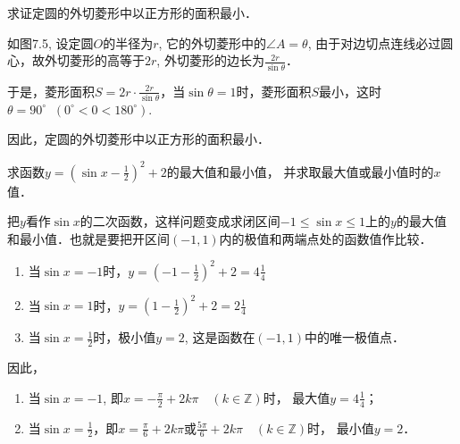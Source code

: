 \begin{example}
    求证定圆的外切菱形中以正方形的面积最小．
\end{example}

\begin{solution}
如图7.5, 设定圆$O$的半径为$r$, 它的外切菱形中的$\angle A=\theta$, 由于对边切点连线必过圆心，故外切菱形的高等于$2r$, 外切菱形的边长为$\frac{2r}{\sin\theta}$．

\begin{figure}[htp]
    \centering
    \caption{}
\end{figure}

    于是，菱形面积$S=2r\cdot \frac{2r}{\sin\theta}$，当$\sin\theta=1$时，菱形面积$S$最小，这时$\theta=90^{\circ}\;\;(0^{\circ}<0<180^{\circ})$.
    
因此，定圆的外切菱形中以正方形的面积最小．
\end{solution}

\begin{example}
求函数$y=\left(\sin x-\frac{1}{2}\right)^2+2$的最大值和最小值，
并求取最大值或最小值时的$x$值．
\end{example}

\begin{solution}
    把$y$看作$\sin x$的二次函数，这样问题变成求闭区间$-1\le \sin x\le 1$上的$y$的最大值和最小值．也就是要把开区间$(-1, 1)$内的极值和两端点处的函数值作比较．

\begin{enumerate}
    \item 当$\sin x=-1$时，$y=\left(-1-\frac{1}{2}\right)^2+2=4\frac{1}{4}$
    \item 当$\sin x=1$时，$y=\left(1-\frac{1}{2}\right)^2+2=2\frac{1}{4}$
    \item 当$\sin x=\frac{1}{2}$时，极小值$y=2$, 这是函数在$(-1, 1)$中的唯一极值点．
\end{enumerate}

因此，
\begin{enumerate}
    \item 当$\sin x=-1$, 即$x=-\frac{\pi}{2}+2k\pi\quad (k\in\mathbb{Z})$时，
最大值$y=4\frac{1}{4}$；
\item 当$\sin x=\frac{1}{2}$，即$x=\frac{\pi}{6}+2k\pi$或$\frac{5\pi}{6}+2k\pi \quad (k\in\mathbb{Z})$时，
最小值$y=2$．
\end{enumerate}


\end{solution}


